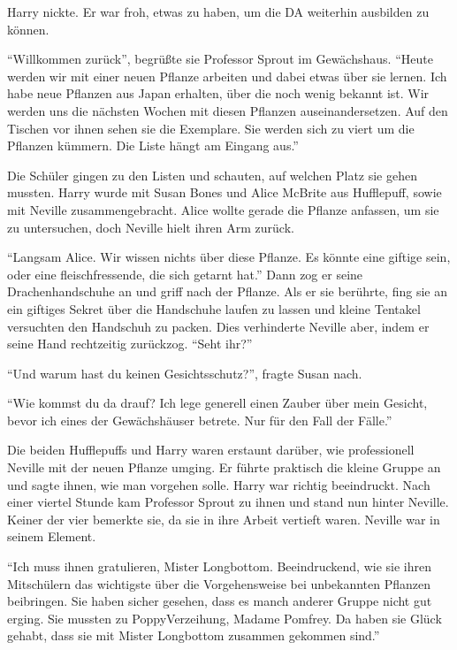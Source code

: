 Harry nickte. Er war froh, etwas zu haben, um die DA weiterhin ausbilden zu können.

\trenn

\enquote{Willkommen zurück}, begrüßte sie  Professor Sprout im Gewächshaus. \enquote{Heute werden wir mit einer neuen Pflanze arbeiten und dabei etwas über sie lernen. Ich habe neue Pflanzen aus Japan erhalten, über die noch wenig bekannt ist. Wir werden uns die nächsten Wochen mit diesen Pflanzen auseinandersetzen. Auf den Tischen vor ihnen sehen sie die Exemplare. Sie werden sich zu viert um die Pflanzen kümmern. Die Liste hängt am Eingang aus.}

Die Schüler gingen zu den Listen und schauten, auf welchen Platz sie gehen mussten. Harry wurde mit Susan Bones und Alice McBrite aus Hufflepuff, sowie mit Neville zusammengebracht. Alice wollte gerade die Pflanze anfassen, um sie zu untersuchen, doch Neville hielt ihren Arm zurück.

\enquote{Langsam Alice. Wir wissen nichts über diese Pflanze. Es könnte eine giftige sein, oder eine fleischfressende, die sich getarnt hat.} Dann zog er seine Drachenhandschuhe an und griff nach der Pflanze. Als er sie berührte, fing sie an ein giftiges Sekret über die Handschuhe laufen zu lassen und kleine Tentakel versuchten den Handschuh zu packen. Dies verhinderte Neville aber, indem er seine Hand rechtzeitig zurückzog. \enquote{Seht ihr?}

\enquote{Und warum hast du keinen Gesichtsschutz?}, fragte Susan nach.

\enquote{Wie kommst du da drauf? Ich lege generell einen Zauber über mein Gesicht, bevor ich eines der Gewächshäuser betrete. Nur für den Fall der Fälle.}

Die beiden Hufflepuffs und Harry waren erstaunt darüber, wie professionell Neville mit der neuen Pflanze umging. Er führte praktisch die kleine Gruppe an und sagte ihnen, wie man vorgehen solle. Harry war richtig beeindruckt. Nach einer viertel Stunde kam Professor Sprout zu ihnen und stand nun hinter Neville. Keiner der vier bemerkte sie, da sie in ihre Arbeit vertieft waren. Neville war in seinem Element.

\enquote{Ich muss ihnen gratulieren, Mister Longbottom. Beeindruckend, wie sie ihren Mitschülern das wichtigste über die Vorgehensweise bei unbekannten Pflanzen beibringen. Sie haben sicher gesehen, dass es manch anderer Gruppe nicht gut erging. Sie mussten zu Poppy\abs Verzeihung, Madame Pomfrey. Da haben sie Glück gehabt, dass sie mit Mister Longbottom zusammen gekommen sind.}

